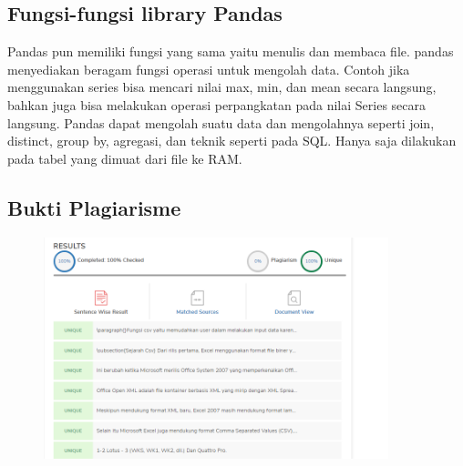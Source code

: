 \begin{itemize}
\subsection{Fungsi-fungsi library Pandas}
Pandas pun memiliki fungsi yang sama yaitu menulis dan membaca file. pandas menyediakan beragam fungsi operasi untuk mengolah data. Contoh jika menggunakan series bisa mencari nilai max, min, dan mean secara langsung, bahkan juga bisa melakukan operasi perpangkatan pada nilai Series secara langsung.
Pandas dapat mengolah suatu data dan mengolahnya seperti join, distinct, group by, agregasi, dan teknik seperti pada SQL. Hanya saja dilakukan pada tabel yang dimuat dari file ke RAM.
\subsection{Bukti Plagiarisme}
\begin{figure}[h]
	\includegraphics[width=10cm]{figures/epi/nih.png}
	\centering
\end{figure}
\end{itemize}
